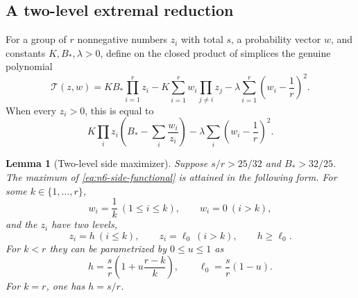 \documentclass[11pt,a4paper]{article}
\numberwithin{equation}{section}
\newtheorem{lemma}[theorem]{Lemma}
\theoremstyle{definition}
\newcommand{\1}{\mathbf{1}}
\begin{document}
\subsection{A two-level extremal reduction}

For a group of $r$ nonnegative numbers $z_i$ with total $s$, a probability
vector $w$, and constants $K,B_*,\lambda>0$, define on the closed product
of simplices the genuine polynomial
\begin{equation}\label{eq:n6-side-functional}
 \mathcal T(z,w)=
 KB_*\prod_{i=1}^r z_i
 -K\sum_{i=1}^r w_i\prod_{j\ne i}z_j
 -\lambda\sum_{i=1}^r\left(w_i-\frac1r\right)^2.
\end{equation}
When every $z_i>0$, this is equal to
\[
 K\prod_i z_i\left(B_*-\sum_i\frac{w_i}{z_i}\right)
 -\lambda\sum_i\left(w_i-\frac1r\right)^2.
\]

\begin{lemma}[Two-level side maximizer]\label{lem:n6-two-level}
Suppose $s/r>25/32$ and $B_*>32/25$.  The maximum of
\eqref{eq:n6-side-functional} is attained in the following form.  For some
$k\in\{1,\dots,r\}$,
\[
 w_i=\frac1k\ (1\le i\le k),
 \qquad
 w_i=0\ (i>k),
\]
and the $z_i$ have two levels,
\[
 z_i=h\ (i\le k),
 \qquad
 z_i=\ell_0\ (i>k),
 \qquad h\ge\ell_0.
\]
For $k<r$ they can be parametrized by $0\le u\le1$ as
\begin{equation}\label{eq:n6-two-level-param}
 h=\frac{s}{r}\left(1+u\frac{r-k}{k}\right),
 \qquad
 \ell_0=\frac{s}{r}(1-u).
\end{equation}
For $k=r$, one has $h=s/r$.
\end{lemma}
\end{document}
